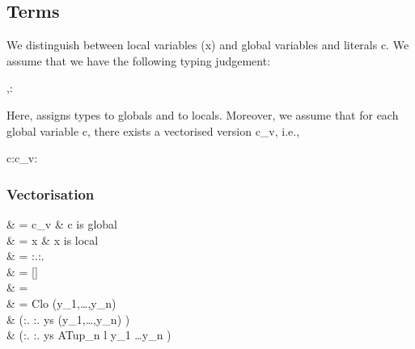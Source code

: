 \documentclass{article}
\begin{document}
\subsection*{Terms}

We distinguish between local variables (\<x\>) and global variables and
literals \<c\>.  We assume that we have the following typing judgement:

\begin{haskell}
\Delta,\Gamma{}:\sigma
\end{haskell}

Here, \<\Delta\> assigns types to globals and \<\Gamma\> to locals. Moreover,
we assume that for each global variable \<c\>, there exists a
vectorised version \<c_v\>, i.e.,

\begin{haskell}
c:\sigma\in\Delta \Longrightarrow c_v:\vect{\sigma}\in\Delta
\end{haskell}

\subsubsection*{Vectorisation}

\begin{haskell}
 & = c_v & c is global \\
 & = x   & x is local \\
 & = 
\Lambda\alpha:\kappa.:\patype{\alpha:\kappa}. \\
 & = [\vect{\sigma}] \\
 & = \capp{} \\
 & = Clo \vect{\sigma} \vect{\phi} \tau \pa{\tau}
                                   (y_1,\dots,y_n) \\
  &
\quad\quad(:\tau.
           :\vect{\sigma}.
            ys  (y_1,\dots,y_n) \to {}) \\
  &
\quad\quad(:\parr{\tau}.
           :\parr{\vect{\sigma}}.
            ys  ATup_n l y_1 \dots y_n \to {})
\\
\end{haskell}
\end{document}
